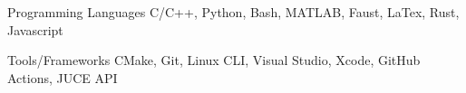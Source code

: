 

\begin{cvskills}

  \cvskill
    {Programming Languages} %
    {C/C++, Python, Bash, MATLAB, Faust, LaTex, Rust, Javascript} %

    \cvskill
    {Tools/Frameworks} %
    {CMake, Git, Linux CLI, Visual Studio, Xcode, GitHub Actions, JUCE API} %


\end{cvskills}
